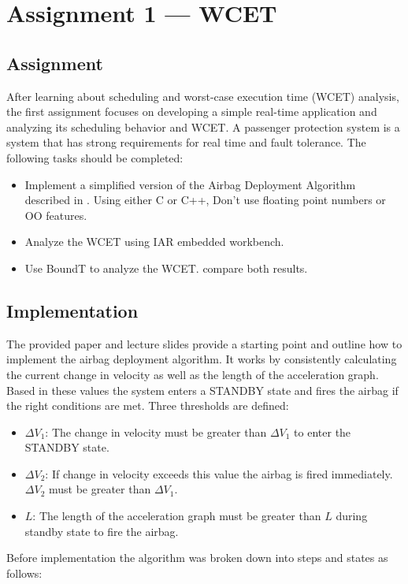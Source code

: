 \chapter{Assignment 1 --- WCET}

\section{Assignment}
After learning about scheduling and worst-case execution time (WCET) analysis, the first assignment focuses on developing a simple real-time application and analyzing its scheduling behavior and WCET. A passenger protection system is a system that has strong requirements for real time and fault tolerance. The following tasks should be completed: 
\begin{itemize}
    \item Implement a simplified version of the Airbag Deployment Algorithm described in \cite{mahmudNewDecisionMaking1995}. Using either C or C++, Don't use floating point numbers or OO features. 
    \item Analyze the WCET using IAR embedded workbench.
    \item Use BoundT to analyze the WCET. compare both results.
\end{itemize}

\section{Implementation}
The provided paper and lecture slides provide a starting point and outline how to implement the airbag deployment algorithm. 
It works by consistently calculating the current change in velocity as well as the length of the acceleration graph. Based in these values the system enters a STANDBY state and fires the airbag if the right conditions are met. 
Three thresholds are defined:  
\begin{itemize}
    \item $\Delta V_1$: The change in velocity must be greater than $\Delta V_1$ to enter the STANDBY state.
    \item $\Delta V_2$: If change in velocity exceeds this value the airbag is fired immediately. $\Delta V_2$ must be greater than $\Delta V_1$.
    \item $L$: The length of the acceleration graph must be greater than $L$ during standby state to fire the airbag.
\end{itemize}

Before implementation the algorithm was broken down into steps and states as follows: 

